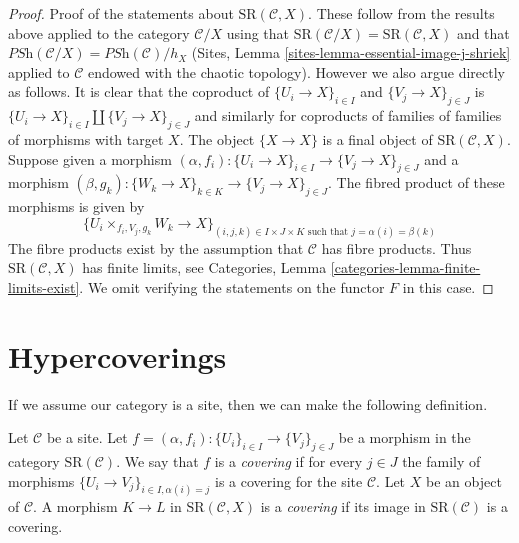 \begin{proof}
\medskip\noindent
Proof of the statements about $\text{SR}(\mathcal{C}, X)$.
These follow from the results above applied to the category
$\mathcal{C}/X$ using that
$\text{SR}(\mathcal{C}/X) = \text{SR}(\mathcal{C}, X)$ and that
$\textit{PSh}(\mathcal{C}/X) = \textit{PSh}(\mathcal{C})/h_X$
(Sites, Lemma \ref{sites-lemma-essential-image-j-shriek} applied
to $\mathcal{C}$ endowed with the chaotic topology). However
we also argue directly as follows.
It is clear that the coproduct of
$\{U_i \to X\}_{i \in I}$ and $\{V_j \to X\}_{j \in J}$
is $\{U_i \to X\}_{i \in I} \amalg \{V_j \to X\}_{j \in J}$
and similarly for coproducts of
families of families of morphisms with target $X$.
The object $\{X \to X\}$ is a final
object of $\text{SR}(\mathcal{C}, X)$.
Suppose given a morphism
$(\alpha, f_i) : \{U_i \to X\}_{i \in I} \to \{V_j \to X\}_{j \in J}$
and a morphism
$(\beta, g_k) : \{W_k \to X\}_{k \in K} \to \{V_j \to X\}_{j \in J}$.
The fibred product of these morphisms is given by
$$
\{ U_i \times_{f_i, V_j, g_k} W_k \to X \}_{(i, j, k) \in I \times J \times K
\text{ such that } j = \alpha(i) = \beta(k)}
$$
The fibre products exist by the assumption that
$\mathcal{C}$ has fibre products.
Thus $\text{SR}(\mathcal{C}, X)$ has finite limits,
see Categories, Lemma \ref{categories-lemma-finite-limits-exist}.
We omit verifying the statements on the functor $F$ in this case.
\end{proof}





\section{Hypercoverings}
\label{section-hypercoverings}

\noindent
If we assume our category is a site, then we can make the following
definition.

\begin{definition}
\label{definition-covering-SR}
Let $\mathcal{C}$ be a site. Let
$f = (\alpha, f_i) : \{U_i\}_{i \in I} \to \{V_j\}_{j \in J}$
be a morphism in the category $\text{SR}(\mathcal{C})$.
We say that $f$ is a {\it covering} if for every $j \in J$ the
family of morphisms $\{U_i \to V_j\}_{i \in I, \alpha(i) = j}$
is a covering for the site $\mathcal{C}$.
Let $X$ be an object of $\mathcal{C}$.
A morphism $K \to L$ in $\text{SR}(\mathcal{C}, X)$ is
a {\it covering} if its image in $\text{SR}(\mathcal{C})$ is
a covering.
\end{definition}

